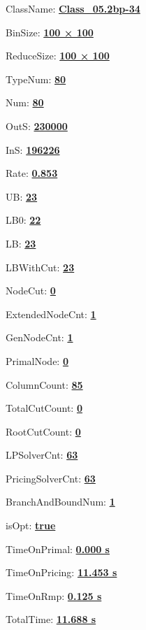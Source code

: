 \documentclass[11pt]{article}
\begin{document}
\pagestyle{empty}


ClassName: \underline{\textbf{Class_05.2bp-34}}
\par
BinSize: \underline{\textbf{100 × 100}}
\par
ReduceSize: \underline{\textbf{100 × 100}}
\par
TypeNum: \underline{\textbf{80}}
\par
Num: \underline{\textbf{80}}
\par
OutS: \underline{\textbf{230000}}
\par
InS: \underline{\textbf{196226}}
\par
Rate: \underline{\textbf{0.853}}
\par
UB: \underline{\textbf{23}}
\par
LB0: \underline{\textbf{22}}
\par
LB: \underline{\textbf{23}}
\par
LBWithCut: \underline{\textbf{23}}
\par
NodeCut: \underline{\textbf{0}}
\par
ExtendedNodeCnt: \underline{\textbf{1}}
\par
GenNodeCnt: \underline{\textbf{1}}
\par
PrimalNode: \underline{\textbf{0}}
\par
ColumnCount: \underline{\textbf{85}}
\par
TotalCutCount: \underline{\textbf{0}}
\par
RootCutCount: \underline{\textbf{0}}
\par
LPSolverCnt: \underline{\textbf{63}}
\par
PricingSolverCnt: \underline{\textbf{63}}
\par
BranchAndBoundNum: \underline{\textbf{1}}
\par
isOpt: \underline{\textbf{true}}
\par
TimeOnPrimal: \underline{\textbf{0.000 s}}
\par
TimeOnPricing: \underline{\textbf{11.453 s}}
\par
TimeOnRmp: \underline{\textbf{0.125 s}}
\par
TotalTime: \underline{\textbf{11.688 s}}
\par
\newpage


\end{document}
